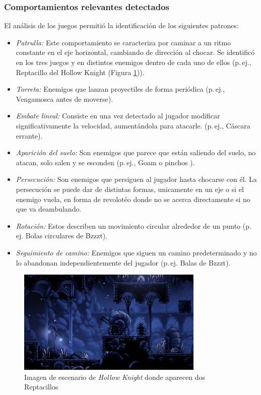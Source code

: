 \subsubsection{Comportamientos relevantes detectados}
El análisis de los juegos permitió la identificación de los siguientes patrones:  
\begin{itemize}
  \item \emph{Patrulla:} Este comportamiento se caracteriza por caminar a un ritmo constante en el eje horizontal, cambiando de dirección al chocar. Se identificó en los tres juegos y en distintos enemigos dentro de cada uno de ellos (p.\,ej., Reptacillo del Hollow Knight (Figura \ref{fig:Reptacillo})).  
  \item \emph{Torreta:} Enemigos que lanzan proyectiles de forma periódica  (p.\,ej., Vengamosca antes de moverse).  
  \item \emph{Embate lineal:} Consiste en una vez detectado al jugador modificar significativamente la velocidad, aumentándola para atacarle. (p.\,ej., Cáscara errante).  
  \item \emph{Aparición del suelo:} Son enemigos que parece que están saliendo del suelo, no atacan, solo salen y se esconden (p.\,ej., Goam o pinchos ).  
  \item \emph{Persecución:} Son enemigos que persiguen al jugador hasta chocarse con él. La persecución se puede dar de distintas formas, unicamente en un eje o si el enemigo vuela, en forma de revolotéo donde no se acerca directamente si no que va deambulando.
  \item \emph{Rotación:} Estos describen un movimiento circular alrededor de un punto (p.\,ej. Bolas circulares de Bzzzt).
  \item \emph{Seguimiento de camino:} Enemigos que siguen un camino predeterminado y no lo abandonan independientemente del jugador (p.\,ej. Balas de Bzzzt).
\end{itemize}

\begin{figure}[t]
	\centering
	\includegraphics[height=5cm]{Imagenes/Reptacillo_Image.png}
	\caption{Imagen de escenario de \textit{Hollow Knight} donde aparecen dos Reptacillos}
	\label{fig:Reptacillo}
\end{figure}

